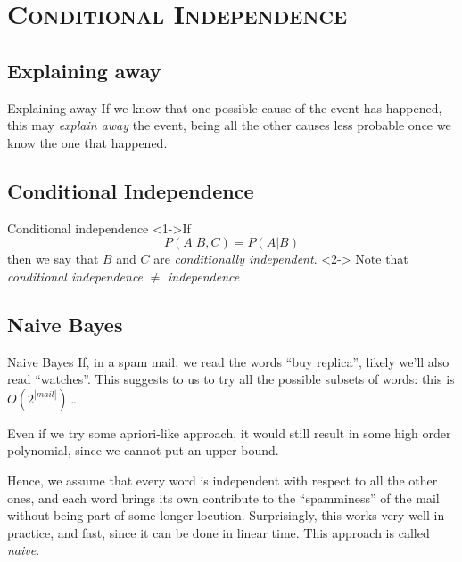 \documentclass[xcolor=x11names,compress]{beamer}
\renewcommand{\(}{\begin{columns}}
\renewcommand{\)}{\end{columns}}
\newcommand{\<}[1]{\begin{column}{#1}}
\renewcommand{\>}{\end{column}}
\begin{document}
\section{\scshape Conditional Independence}
\subsection{Explaining away}
\begin{frame}{Explaining away}
    If we know that one possible cause of the event has happened, this may \textit{explain away} the event, being all the other causes less probable once we know the one that happened.
\end{frame}


\subsection{Conditional Independence}
\begin{frame}{Conditional independence}
    <1->{If
    $$
    P(A|B,C) = P(A|B)
    $$
    then we say that $B$ and $C$ are \textit{conditionally independent}.}
    <2->{
        Note that \textit{conditional independence} $\neq$ \textit{independence}
    }
\end{frame}

\subsection{Naive Bayes}
\begin{frame}{Naive Bayes}
    If, in a spam mail, we read the words ``buy replica'', likely we'll also read ``watches''. This suggests to us to try all the possible subsets of words: this is $O(2^{|mail|})$\dots
    
    Even if we try some apriori-like approach, it would still result in some high order polynomial, since we cannot put an upper bound.
    
    Hence, we assume that every word is independent with respect to all the other ones, and each word brings its own contribute to the ``spamminess'' of the mail without being part of some longer locution. Surprisingly, this works very well in practice, and fast, since it can be done in linear time. This approach is called \textit{naive}.
\end{frame}
\end{document}
